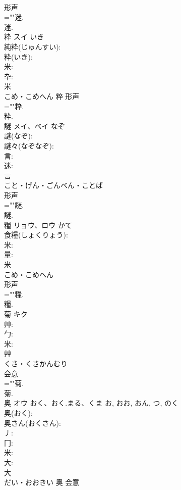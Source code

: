 \documentclass[8pt]{extreport}
\begin{document}
\begin{CJK}{UTF8}{min}
\\	形声 
\\	=""迷.
\\	迷.
\\	粋	スイ	いき		
\\	純粋(じゅんすい): 
\\	粋(いき): 
\\	米: 
\\	卆: 
\\	米	
\\	こめ・こめへん	粹	形声 
\\	=""粋.
\\	粋.
\\	謎	メイ、ベイ	なぞ		
\\	謎(なぞ): 
\\	謎々(なぞなぞ): 
\\	言: 
\\	迷: 
\\	言	
\\	こと・げん・ごんべん・ことば	
\\	形声 
\\	=""謎.
\\	謎.
\\	糧	リョウ、ロウ	かて		
\\	食糧(しょくりょう): 
\\	米: 
\\	量: 
\\	米	
\\	こめ・こめへん	
\\	形声 
\\	=""糧.
\\	糧.
\\	菊	キク			
\\	艸: 
\\	勹: 
\\	米: 
\\	艸	
\\	くさ・くさかんむり	
\\	会意 
\\	=""菊.
\\	菊.
\\	奥	オウ	おく、おく.まる、くま	お, おお, おん, つ, のく	
\\	奥(おく): 
\\	奥さん(おくさん): 
\\	丿: 
\\	冂: 
\\	米: 
\\	大: 
\\	大	
\\	だい・おおきい	奧	会意 

\end{CJK}
\end{document}
